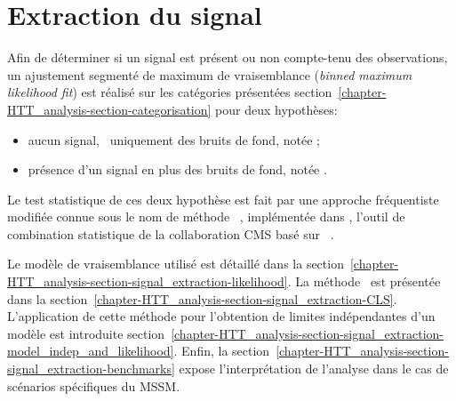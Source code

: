 \section{Extraction du signal}\label{chapter-HTT_analysis-section-signal_extraction}
Afin de déterminer si un signal est présent ou non compte-tenu des observations,
un ajustement segmenté de maximum de vraisemblance (\emph{binned maximum likelihood fit}) est réalisé sur les catégories présentées section~\ref{chapter-HTT_analysis-section-categorisation} pour deux hypothèses:
\begin{itemize}
\item aucun signal, \ie\ uniquement des bruits de fond, notée \hypB;
\item présence d'un signal en plus des bruits de fond, notée \hypSB.
\end{itemize}
Le test statistique de ces deux hypothèse est fait par une approche fréquentiste modifiée connue sous le nom de méthode \CLS~\cite{Junk:1999kv,CLs_method,Read_2002}, implémentée dans \COMBINE, l'outil de combination statistique de la collaboration CMS basé sur \ROOSTATS~\cite{RooStats}.
\par
Le modèle de vraisemblance utilisé est détaillé dans la section~\ref{chapter-HTT_analysis-section-signal_extraction-likelihood}.
La méthode \CLS\ est présentée dans la section~\ref{chapter-HTT_analysis-section-signal_extraction-CLS}.
L'application de cette méthode pour l'obtention de limites indépendantes d'un modèle est introduite section~\ref{chapter-HTT_analysis-section-signal_extraction-model_indep_and_likelihood}.
Enfin, la section~\ref{chapter-HTT_analysis-section-signal_extraction-benchmarks} expose l'interprétation de l'analyse dans le cas de scénarios spécifiques du MSSM.



